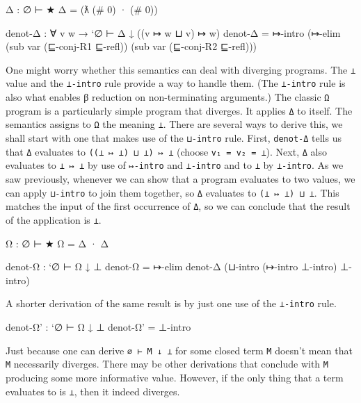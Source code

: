 \begin{fence}
\begin{code}
Δ : ∅ ⊢ ★
Δ = (ƛ (# 0) · (# 0))

denot-Δ : ∀ {v w} → `∅ ⊢ Δ ↓ ((v ↦ w ⊔ v) ↦ w)
denot-Δ = ↦-intro (↦-elim (sub var (⊑-conj-R1 ⊑-refl))
                          (sub var (⊑-conj-R2 ⊑-refl)))
\end{code}
\end{fence}

One might worry whether this semantics can deal with diverging programs.
The \texttt{⊥} value and the \texttt{⊥-intro} rule provide a way to
handle them. (The \texttt{⊥-intro} rule is also what enables β reduction
on non-terminating arguments.) The classic \texttt{Ω} program is a
particularly simple program that diverges. It applies \texttt{Δ} to
itself. The semantics assigns to \texttt{Ω} the meaning \texttt{⊥}.
There are several ways to derive this, we shall start with one that
makes use of the \texttt{⊔-intro} rule. First, \texttt{denot-Δ} tells us
that \texttt{Δ} evaluates to \texttt{((⊥\ ↦\ ⊥)\ ⊔\ ⊥)\ ↦\ ⊥} (choose
\texttt{v₁\ =\ v₂\ =\ ⊥}). Next, \texttt{Δ} also evaluates to
\texttt{⊥\ ↦\ ⊥} by use of \texttt{↦-intro} and \texttt{⊥-intro} and to
\texttt{⊥} by \texttt{⊥-intro}. As we saw previously, whenever we can
show that a program evaluates to two values, we can apply
\texttt{⊔-intro} to join them together, so \texttt{Δ} evaluates to
\texttt{(⊥\ ↦\ ⊥)\ ⊔\ ⊥}. This matches the input of the first occurrence
of \texttt{Δ}, so we can conclude that the result of the application is
\texttt{⊥}.

\begin{fence}
\begin{code}
Ω : ∅ ⊢ ★
Ω = Δ · Δ

denot-Ω : `∅ ⊢ Ω ↓ ⊥
denot-Ω = ↦-elim denot-Δ (⊔-intro (↦-intro ⊥-intro) ⊥-intro)
\end{code}
\end{fence}

A shorter derivation of the same result is by just one use of the
\texttt{⊥-intro} rule.

\begin{fence}
\begin{code}
denot-Ω' : `∅ ⊢ Ω ↓ ⊥
denot-Ω' = ⊥-intro
\end{code}
\end{fence}

Just because one can derive \texttt{∅\ ⊢\ M\ ↓\ ⊥} for some closed term
\texttt{M} doesn't mean that \texttt{M} necessarily diverges. There may
be other derivations that conclude with \texttt{M} producing some more
informative value. However, if the only thing that a term evaluates to
is \texttt{⊥}, then it indeed diverges.

